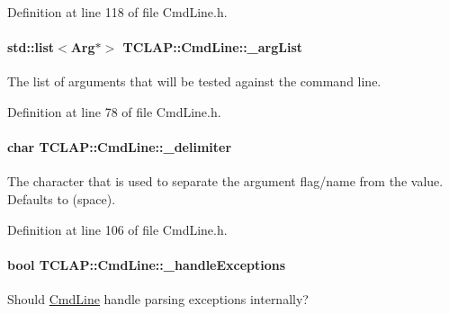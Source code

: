 Definition at line 118 of file Cmd\+Line.\+h.

\paragraph[{\texorpdfstring{\+\_\+arg\+List}{_argList}}]{\setlength{\rightskip}{0pt plus 5cm}std\+::list$<${\bf Arg}$\ast$$>$ T\+C\+L\+A\+P\+::\+Cmd\+Line\+::\+\_\+arg\+List\hspace{0.3cm}{\ttfamily [protected]}}\hypertarget{classTCLAP_1_1CmdLine_a4d70f73542d8184e077688bff3801baf}{}\label{classTCLAP_1_1CmdLine_a4d70f73542d8184e077688bff3801baf}
The list of arguments that will be tested against the command line. 

Definition at line 78 of file Cmd\+Line.\+h.

\paragraph[{\texorpdfstring{\+\_\+delimiter}{_delimiter}}]{\setlength{\rightskip}{0pt plus 5cm}char T\+C\+L\+A\+P\+::\+Cmd\+Line\+::\+\_\+delimiter\hspace{0.3cm}{\ttfamily [protected]}}\hypertarget{classTCLAP_1_1CmdLine_a602e65692dc07ea872134f354026a54f}{}\label{classTCLAP_1_1CmdLine_a602e65692dc07ea872134f354026a54f}
The character that is used to separate the argument flag/name from the value. Defaults to \textquotesingle{} \textquotesingle{} (space). 

Definition at line 106 of file Cmd\+Line.\+h.

\paragraph[{\texorpdfstring{\+\_\+handle\+Exceptions}{_handleExceptions}}]{\setlength{\rightskip}{0pt plus 5cm}bool T\+C\+L\+A\+P\+::\+Cmd\+Line\+::\+\_\+handle\+Exceptions\hspace{0.3cm}{\ttfamily [protected]}}\hypertarget{classTCLAP_1_1CmdLine_a3609d0c13886053b367d1df80efbe67b}{}\label{classTCLAP_1_1CmdLine_a3609d0c13886053b367d1df80efbe67b}
Should \hyperlink{classTCLAP_1_1CmdLine}{Cmd\+Line} handle parsing exceptions internally? 

